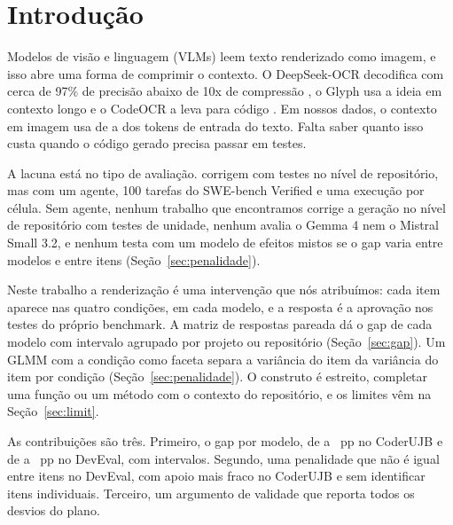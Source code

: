 \section{Introdução}
Modelos de visão e linguagem (VLMs) leem texto renderizado como imagem, e isso abre uma forma de comprimir o contexto. O DeepSeek-OCR decodifica com cerca de 97\% de precisão abaixo de 10x de compressão \citep{wei2025deepseekocr}, o Glyph usa a ideia em contexto longo \citep{cheng2025glyph} e o CodeOCR a leva para código \citep{shi2026codeocr}. Em nossos dados, o contexto em imagem usa de \tokenRatioMinAll{} a \tokenRatioMaxAll{} dos tokens de entrada do texto. Falta saber quanto isso custa quando o código gerado precisa passar em testes.

A lacuna está no tipo de avaliação. \citet{liang2026rendered} corrigem com testes no nível de repositório, mas com um agente, 100 tarefas do SWE-bench Verified e uma execução por célula. Sem agente, nenhum trabalho que encontramos corrige a geração no nível de repositório com testes de unidade, nenhum avalia o Gemma 4 nem o Mistral Small 3.2, e nenhum testa com um modelo de efeitos mistos se o gap varia entre modelos e entre itens (Seção~\ref{sec:penalidade}).

Neste trabalho a renderização é uma intervenção que nós atribuímos: cada item aparece nas quatro condições, em cada modelo, e a resposta é a aprovação nos testes do próprio benchmark. A matriz de respostas pareada \citep[Seção~2.5]{truong2026measurement} dá o gap de cada modelo com intervalo agrupado por projeto ou repositório (Seção~\ref{sec:gap}). Um GLMM com a condição como faceta \citep[cap.~3]{truong2026measurement} separa a variância do item da variância do item por condição (Seção~\ref{sec:penalidade}). O construto é estreito, completar uma função ou um método com o contexto do repositório, e os limites vêm na Seção~\ref{sec:limit}.

As contribuições são três. Primeiro, o gap por modelo, de \gapMinUjb{} a \gapMaxUjb~pp no CoderUJB e de \gapMinDev{} a \gapMaxDev~pp no DevEval, com intervalos. Segundo, uma penalidade que não é igual entre itens no DevEval, com apoio mais fraco no CoderUJB e sem identificar itens individuais. Terceiro, um argumento de validade que reporta todos os desvios do plano.

